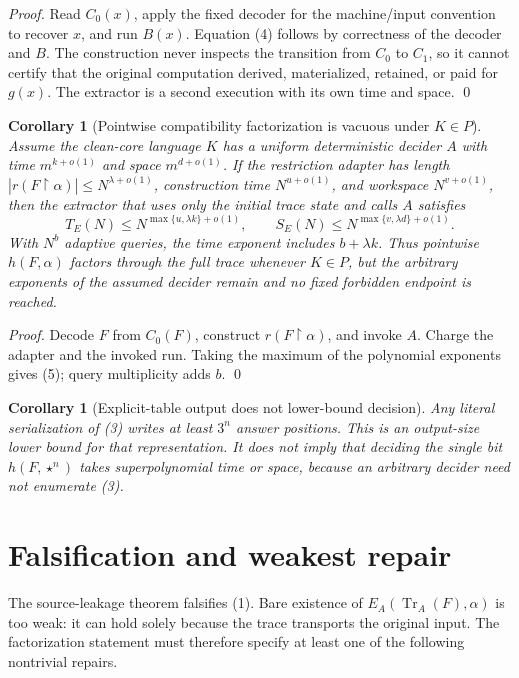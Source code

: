 \documentclass[11pt]{article}
\newtheorem{corollary}[theorem]{Corollary}
\begin{document}
\begin{proof}
Read $C_0(x)$, apply the fixed decoder for the machine/input convention to
recover $x$, and run $B(x)$.  Equation (4) follows by correctness of the
decoder and $B$.  The construction never inspects the transition from $C_0$
to $C_1$, so it cannot certify that the original computation derived,
materialized, retained, or paid for $g(x)$.  The extractor is a second
execution with its own time and space. \qed
\end{proof}

\begin{corollary}[Pointwise compatibility factorization is vacuous under
$K\in P$]
Assume the clean-core language $K$ has a uniform deterministic decider $A$
with time $m^{k+o(1)}$ and space $m^{d+o(1)}$.  If the restriction adapter has
length $|r(F\upharpoonright\alpha)|\le N^{\lambda+o(1)}$, construction time
$N^{u+o(1)}$, and workspace $N^{v+o(1)}$, then the extractor that uses only
the initial trace state and calls $A$ satisfies
\[
 T_E(N)\le N^{\max\{u,\lambda k\}+o(1)},\qquad
 S_E(N)\le N^{\max\{v,\lambda d\}+o(1)}.                  \tag{5}
\]
With $N^b$ adaptive queries, the time exponent includes $b+\lambda k$.
Thus pointwise $h(F,\alpha)$ factors through the full trace whenever $K\in P$,
but the arbitrary exponents of the assumed decider remain and no fixed
forbidden endpoint is reached.
\end{corollary}

\begin{proof}
Decode $F$ from $C_0(F)$, construct $r(F\upharpoonright\alpha)$, and invoke
$A$.  Charge the adapter and the invoked run.  Taking the maximum of the
polynomial exponents gives (5); query multiplicity adds $b$. \qed
\end{proof}

\begin{corollary}[Explicit-table output does not lower-bound decision]
Any literal serialization of (3) writes at least $3^n$ answer positions.
This is an output-size lower bound for that representation.  It does not imply
that deciding the single bit $h(F,\star^n)$ takes superpolynomial time or
space, because an arbitrary decider need not enumerate (3).
\end{corollary}

\section{Falsification and weakest repair}
The source-leakage theorem falsifies (1).  Bare existence of
$E_A(\operatorname{Tr}_A(F),\alpha)$ is too weak: it can hold solely because
the trace transports the original input.  The factorization statement must
therefore specify at least one of the following nontrivial repairs.
\end{document}
